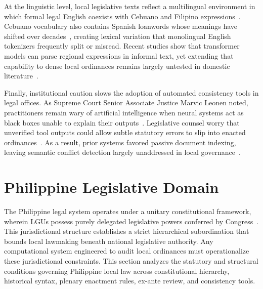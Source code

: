         At the linguistic level, local legislative texts reflect a multilingual environment in which formal legal English coexists with Cebuano and Filipino expressions~\cite{dreisbach2021language}. Cebuano vocabulary also contains Spanish loanwords whose meanings have shifted over decades~\cite{maxilom2008semantic}, creating lexical variation that monolingual English tokenizers frequently split or misread. Recent studies show that transformer models can parse regional expressions in informal text, yet extending that capability to dense local ordinances remains largely untested in domestic literature~\cite{citygov2025lissp, Greco2023Bringing}.

        Finally, institutional caution slows the adoption of automated consistency tools in legal offices. As Supreme Court Senior Associate Justice Marvic Leonen noted, practitioners remain wary of artificial intelligence when neural systems act as black boxes unable to explain their outputs~\cite{leonen2024keynote}. Legislative counsel worry that unverified tool outputs could allow subtle statutory errors to slip into enacted ordinances~\cite{conchas2025digital}. As a result, prior systems favored passive document indexing, leaving semantic conflict detection largely unaddressed in local governance~\cite{ashley2017artificial}.

\section{Philippine Legislative Domain}
The Philippine legal system operates under a unitary constitutional framework, wherein LGUs possess purely delegated legislative powers conferred by Congress~\cite{philgov1991ra7160}. This jurisdictional structure establishes a strict hierarchical subordination that bounds local lawmaking beneath national legislative authority. Any computational system engineered to audit local ordinances must operationalize these jurisdictional constraints. This section analyzes the statutory and structural conditions governing Philippine local law across constitutional hierarchy, historical syntax, plenary enactment rules, ex-ante review, and consistency tools.

